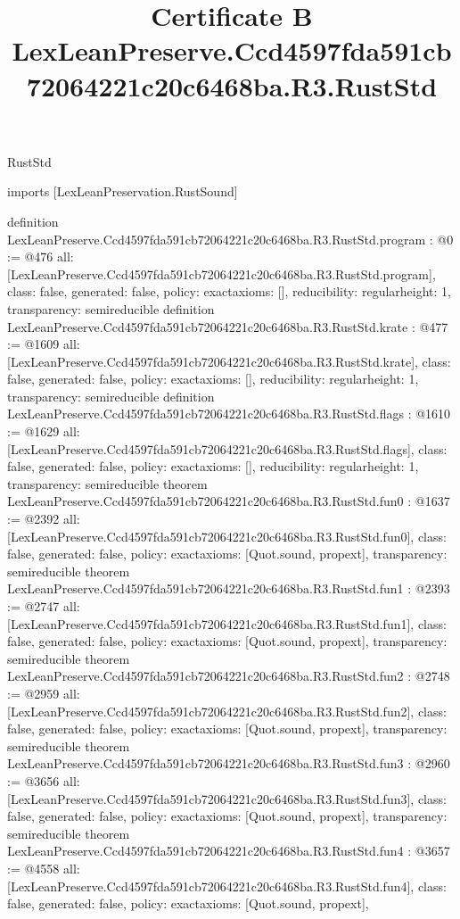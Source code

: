 \begin{lexlean}{RustStd}
\title{Certificate B LexLeanPreserve.Ccd4597fda591cb72064221c20c6468ba.R3.RustStd}
\begin{coremodule}
imports [LexLeanPreservation.RustSound]

definition LexLeanPreserve.Ccd4597fda591cb72064221c20c6468ba.R3.RustStd.program : @0 := @476 {
  all: [LexLeanPreserve.Ccd4597fda591cb72064221c20c6468ba.R3.RustStd.program],
  class: false,
  generated: false,
  policy: exact{axioms: []},
  reducibility: regular{height: 1},
  transparency: semireducible
}
definition LexLeanPreserve.Ccd4597fda591cb72064221c20c6468ba.R3.RustStd.krate : @477 := @1609 {
  all: [LexLeanPreserve.Ccd4597fda591cb72064221c20c6468ba.R3.RustStd.krate],
  class: false,
  generated: false,
  policy: exact{axioms: []},
  reducibility: regular{height: 1},
  transparency: semireducible
}
definition LexLeanPreserve.Ccd4597fda591cb72064221c20c6468ba.R3.RustStd.flags : @1610 := @1629 {
  all: [LexLeanPreserve.Ccd4597fda591cb72064221c20c6468ba.R3.RustStd.flags],
  class: false,
  generated: false,
  policy: exact{axioms: []},
  reducibility: regular{height: 1},
  transparency: semireducible
}
theorem LexLeanPreserve.Ccd4597fda591cb72064221c20c6468ba.R3.RustStd.fun0 : @1637 := @2392 {
  all: [LexLeanPreserve.Ccd4597fda591cb72064221c20c6468ba.R3.RustStd.fun0],
  class: false,
  generated: false,
  policy: exact{axioms: [Quot.sound, propext]},
  transparency: semireducible
}
theorem LexLeanPreserve.Ccd4597fda591cb72064221c20c6468ba.R3.RustStd.fun1 : @2393 := @2747 {
  all: [LexLeanPreserve.Ccd4597fda591cb72064221c20c6468ba.R3.RustStd.fun1],
  class: false,
  generated: false,
  policy: exact{axioms: [Quot.sound, propext]},
  transparency: semireducible
}
theorem LexLeanPreserve.Ccd4597fda591cb72064221c20c6468ba.R3.RustStd.fun2 : @2748 := @2959 {
  all: [LexLeanPreserve.Ccd4597fda591cb72064221c20c6468ba.R3.RustStd.fun2],
  class: false,
  generated: false,
  policy: exact{axioms: [Quot.sound, propext]},
  transparency: semireducible
}
theorem LexLeanPreserve.Ccd4597fda591cb72064221c20c6468ba.R3.RustStd.fun3 : @2960 := @3656 {
  all: [LexLeanPreserve.Ccd4597fda591cb72064221c20c6468ba.R3.RustStd.fun3],
  class: false,
  generated: false,
  policy: exact{axioms: [Quot.sound, propext]},
  transparency: semireducible
}
theorem LexLeanPreserve.Ccd4597fda591cb72064221c20c6468ba.R3.RustStd.fun4 : @3657 := @4558 {
  all: [LexLeanPreserve.Ccd4597fda591cb72064221c20c6468ba.R3.RustStd.fun4],
  class: false,
  generated: false,
  policy: exact{axioms: [Quot.sound, propext]},
}
\end{coremodule}
\end{lexlean}
